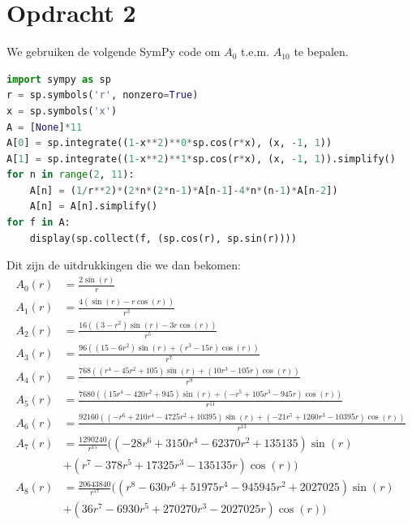 \documentclass[12pt,a4paper]{article}
\theoremstyle{definition}
\numberwithin{equation}{section}
\begin{document}
%
%
\section*{Opdracht 2}
We gebruiken de volgende SymPy code om $A_0$ t.e.m. $A_{10}$ te bepalen\footnotemark{}.
\begin{lstlisting}[language=Python]
import sympy as sp
r = sp.symbols('r', nonzero=True)
x = sp.symbols('x')
A = [None]*11
A[0] = sp.integrate((1-x**2)**0*sp.cos(r*x), (x, -1, 1))
A[1] = sp.integrate((1-x**2)**1*sp.cos(r*x), (x, -1, 1)).simplify()
for n in range(2, 11):
    A[n] = (1/r**2)*(2*n*(2*n-1)*A[n-1]-4*n*(n-1)*A[n-2])
    A[n] = A[n].simplify()
for f in A:
    display(sp.collect(f, (sp.cos(r), sp.sin(r)))) 
\end{lstlisting}
Dit zijn de uitdrukkingen die we dan bekomen:
\begin{align*}
  A_{0}(r) &=\frac{2 \sin{\left(r \right)}}{r} \\
  A_{1}(r) &=\frac{4 \left( \sin{\left(r \right)} - r \cos{\left(r \right)} \right)}{r^{3}} \\
  A_{2}(r) &=\frac{16 \left( \left(3 - r^{2}\right) \sin{\left(r \right)}- 3 r \cos{\left(r \right)} \right)}{r^{5}} \\
  A_{3}(r) &=\frac{96 \left(\left(15 - 6 r^{2}\right) \sin{\left(r \right)} + \left(r^{3} - 15 r\right) \cos{\left(r \right)}\right)}{r^{7}} \\
  A_{4}(r) &=\frac{768 \left(\left(r^{4} - 45 r^{2} + 105\right) \sin{\left(r \right) + \left(10 r^{3} - 105 r\right) \cos{\left(r \right)}}\right)}{r^{9}} \\
  A_{5}(r) &=\frac{7680 \left(\left(15 r^{4} - 420 r^{2} + 945\right) \sin{\left(r \right)} + \left(- r^{5} + 105 r^{3} - 945 r\right) \cos{\left(r \right)}\right)}{r^{11}} \\
  A_{6}(r) &=\frac{92160 \left( \left(- r^{6} + 210 r^{4} - 4725 r^{2} + 10395\right) \sin{\left(r \right)} + \left(- 21 r^{5} + 1260 r^{3} - 10395 r\right) \cos{\left(r \right)}\right)}{r^{13}} \\
  A_{7}(r) &=\frac{1290240}{r^{15}} \bigl(\left(- 28 r^{6} + 3150 r^{4} - 62370 r^{2} + 135135\right) \sin{\left(r \right)}\\ &+ \left(r^{7} - 378 r^{5} + 17325 r^{3} - 135135 r\right) \cos{\left(r \right)}\bigr) \\
  A_{8}(r) &=\frac{20643840}{r^{17}} \bigl(\left(r^{8} - 630 r^{6} + 51975 r^{4} - 945945 r^{2} + 2027025\right) \sin{\left(r \right)} \\ &+ \left(36 r^{7} - 6930 r^{5} + 270270 r^{3} - 2027025 r\right) \cos{\left(r \right)} \bigr) \\

\end{align*}
\end{document}
